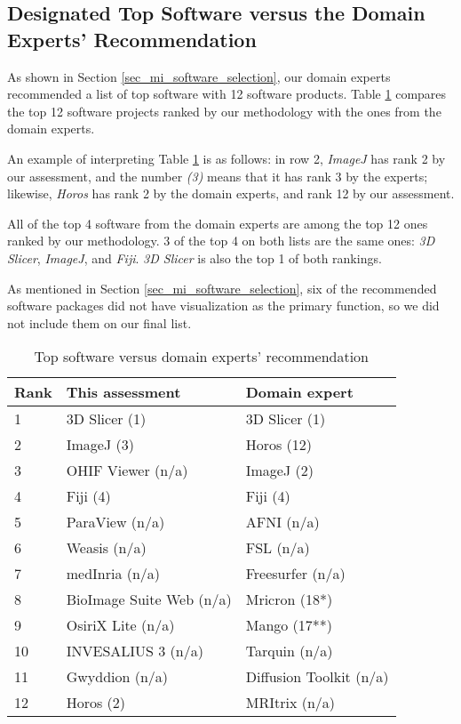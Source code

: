 \subsection{Designated Top Software versus the Domain Experts' Recommendation}
\label{sec_designation_vs_experts}

As shown in Section \ref{sec_mi_software_selection}, our domain experts recommended a list of top software with 12 software products. Table \ref{tab_top_software_vs_experts} compares the top 12 software projects ranked by our methodology with the ones from the domain experts.

An example of interpreting Table \ref{tab_top_software_vs_experts} is as follows: in row 2, \textit{ImageJ} has rank 2 by our assessment, and the number \textit{(3)} means that it has rank 3 by the experts; likewise, \textit{Horos} has rank 2 by the domain experts, and rank 12 by our assessment.

All of the top 4 software from the domain experts are among the top 12 ones ranked by our methodology. 3 of the top 4 on both lists are the same ones: \textit{3D Slicer}, \textit{ImageJ}, and \textit{Fiji}. \textit{3D Slicer} is also the top 1 of both rankings.

As mentioned in Section \ref{sec_mi_software_selection}, six of the recommended software packages did not have visualization as the primary function, so we did not include them on our final list.

\begin{table}[H]
\centering
\begin{tabular}{lll}
\hline
Rank & This assessment & Domain expert \\ \hline
1 & 3D Slicer (1) & 3D Slicer (1) \\
2 & ImageJ (3) & Horos (12) \\
3 & OHIF Viewer (n/a) & ImageJ (2) \\
4 & Fiji (4) & Fiji (4) \\
5 & ParaView (n/a) & AFNI (n/a) \\
6 & Weasis (n/a) & FSL (n/a) \\
7 & medInria (n/a) & Freesurfer (n/a) \\
8 & BioImage Suite Web (n/a) & Mricron (18*) \\
9 & OsiriX Lite (n/a) & Mango (17**) \\
10 & INVESALIUS 3 (n/a) & Tarquin (n/a) \\
11 & Gwyddion (n/a) & Diffusion Toolkit (n/a) \\
12 & Horos (2) & MRItrix (n/a) \\ \hline
\end{tabular}
\caption{\label{tab_top_software_vs_experts}Top software versus domain experts' recommendation}
\end{table}

